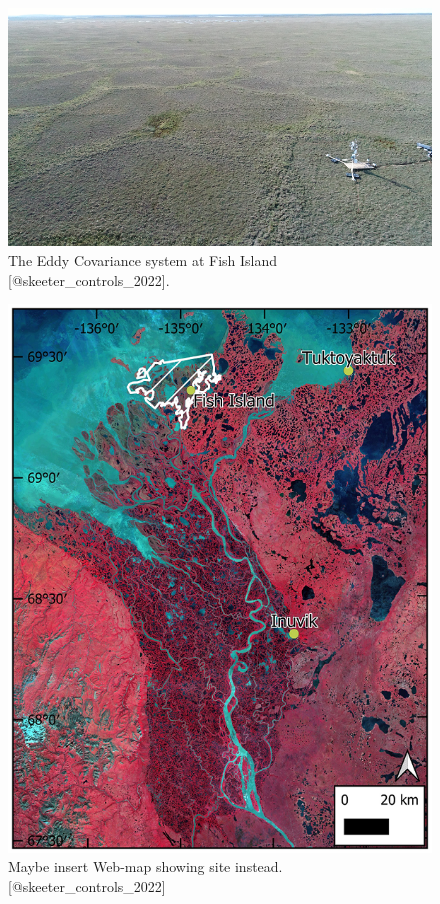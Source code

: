 \documentclass[
]{book}
\begin{document}
\begin{figure}
\includegraphics[width=0.9\linewidth]{images/16-ec-site} \caption{The Eddy Covariance system at Fish Island [@skeeter_controls_2022].}\label{fig:16-ec-site}
\end{figure}

\begin{figure}
\includegraphics[width=0.9\linewidth]{images/16-fig1} \caption{Maybe insert Web-map showing site instead. [@skeeter_controls_2022]}\label{fig:16-fig1}
\end{figure}
\end{document}
